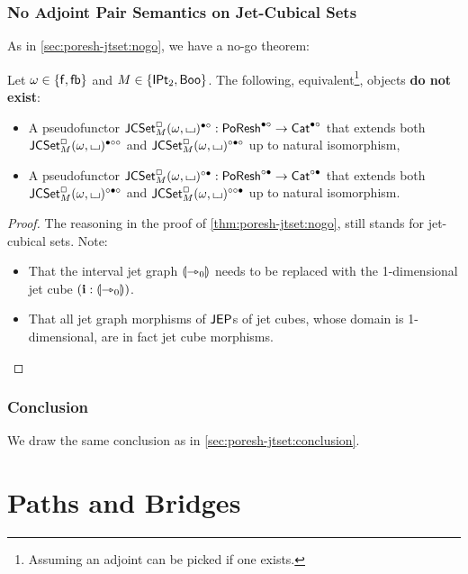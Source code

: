 \documentclass[a4paper]{memoir}
\begin{document}
\subsection{No Adjoint Pair Semantics on Jet-Cubical Sets} \label{sec:poresh-jcset:nogo}
As in \cref{sec:poresh-jtset:nogo}, we have a no-go theorem:
\begin{theorem} \label{thm:poresh-jcset:nogo}
	Let $\omega \in \mathopen{}\left\{ {\mathsf{f}}, {\mathsf{fb}} \right\}\mathclose{}$ and $M \in \mathopen{}\left\{ {\mathsf{IPt}_2}, \mathsf{Boo} \right\}\mathclose{}$.
	The following, equivalent\footnote{Assuming an adjoint can be picked if one exists.}, objects \textbf{do not exist}:
	\begin{itemize}
		\item A pseudofunctor $\mathsf{JCSet}^{\Box}_{M}(\omega,{\llcorner\hspace{-.4ex}\lrcorner})^{\bullet \circ} : \mathsf{PoResh}^{\bullet \circ} \to {\mathsf{Cat}}^{\bullet \circ}$ that extends both $\mathsf{JCSet}^{\Box}_{M}(\omega,{\llcorner\hspace{-.4ex}\lrcorner})^{\bullet \circ \circ}$ and $\mathsf{JCSet}^{\Box}_{M}(\omega,{\llcorner\hspace{-.4ex}\lrcorner})^{\circ \bullet \circ}$ up to natural isomorphism,
		\item A pseudofunctor $\mathsf{JCSet}^{\Box}_{M}(\omega,{\llcorner\hspace{-.4ex}\lrcorner})^{\circ \bullet} : \mathsf{PoResh}^{\circ \bullet} \to {\mathsf{Cat}}^{\circ \bullet}$ that extends both $\mathsf{JCSet}^{\Box}_{M}(\omega,{\llcorner\hspace{-.4ex}\lrcorner})^{\circ \bullet \circ}$ and $\mathsf{JCSet}^{\Box}_{M}(\omega,{\llcorner\hspace{-.4ex}\lrcorner})^{\circ \circ \bullet}$ up to natural isomorphism.
	\end{itemize}
\end{theorem}
\begin{proof}
	The reasoning in the proof of \cref{thm:poresh-jtset:nogo}, still stands for jet-cubical sets. Note:
	\begin{itemize}
		\item That the interval jet graph ${\llparenthesis {\rightarrowtriangle}_0 \rrparenthesis}$ needs to be replaced with the 1-dimensional jet cube $(\mathbf{i} : {\llparenthesis {\rightarrowtriangle}_0 \rrparenthesis})$.
		\item That all jet graph morphisms of $\mathsf{JEP}$s of jet cubes, whose domain is 1-dimensional, are in fact jet cube morphisms. \qedhere
	\end{itemize}
\end{proof}

\subsection{Conclusion} \label{sec:poresh-jcset:conclusion}
We draw the same conclusion as in \cref{sec:poresh-jtset:conclusion}.

\chapter{Paths and Bridges} \label{ch:pb}
\end{document}
